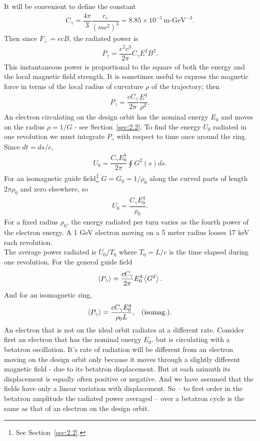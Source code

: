 \documentclass[../sands-adaptation.tex]{subfiles}
\begin{document}
It will be convenient to define the constant
\begin{align} \label{eq:4.2}
	C_\gamma = \dfrac{4 \pi}{3} \dfrac{r_e}{(m c^2)^3} = 8.85 \times 10^{-5}\, \text{m-GeV}^{-3}.
\end{align}
Then since $F_\perp = ecB$, the radiated power is
\begin{align} \label{eq:4.3}
	P_\gamma = \dfrac{e^2 c^3}{2 \pi} C_\gamma E^2 B^2.
\end{align}
This instantaneous power is proportional to the square of both the energy and the local magnetic field strength. It is sometimes useful to express the magnetic force in terms of the local radius of curvature $\rho$ of the trajectory; then
\begin{align} \label{eq:4.4}
	P_\gamma = \dfrac{c C_\gamma}{2 \pi}\dfrac{E^4}{\rho^2}.
\end{align}
An electron circulating on the design orbit has the nominal energy $E_0$ and moves on the radius $\rho = 1/G$ - see Section~\ref{sec:2.2}. To find the energy $U_0$ radiated in one revolution
 we must integrate $P_\gamma$ with respect to time once around the ring. Since $dt = ds/c$,
\begin{align} \label{eq:4.7}
	U_0 = \dfrac{C_\gamma E_0^4}{2 \pi} \oint G^2(s) ds.
\end{align}
For an isomagnetic guide field\footnote{See Section~\ref{sec:2.2}.} $G = G_0 = 1/\rho_0$ along the curved parts of length $2 \pi \rho_0$ and zero elsewhere, so
\begin{align} \label{eq:4.8}
	U_0 = \dfrac{C_\gamma E_0^4}{\rho_0}.
\end{align}
For a fixed radius $\rho_0$, the energy radiated per turn varies as the fourth power of the electron energy. A 1 GeV electron moving on a 5 meter radius looses 17 keV each revolution.\\
The average power radiated is $U_0/T_0$ where $T_0= L/c$ is the time elapsed during one revolution. For the general guide field
\begin{align} \label{eq:4.9}
	\left< P_\gamma \right> = \dfrac{cC_\gamma}{2\pi} E_0^4 \left< G^2 \right>.
\end{align}
And for an isomagnetic ring,
\begin{align} \label{eq:4.10}
	\left< P_\gamma \right> = \dfrac{c C_\gamma E_0^4}{\rho_0 L}, && \text{(isomag.).}
\end{align}
An electron that is not on the ideal orbit radiates at a different rate. Consider first an electron that has the nominal energy $E_0$. but is circulating with a betatron oscillation. It's rate of radiation will be different from an electron moving on the design orbit only because it moves through a slightly different magnetic field - due to its betatron displacement. But at each azimuth its displacement is equally often positive or negative. And we have assumed that the fields have only a linear variation with displacement. So -- to first order in the betatron amplitude the radiated power averaged -- over a betatron cycle is the same as that of an electron on the design orbit.\\
\end{document}

